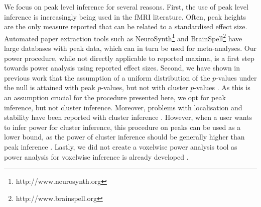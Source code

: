 We focus on peak level inference for several reasons.  First, the use of peak level inference is increasingly being used in the fMRI literature.  Often, peak heights are the only measure reported that can be related to a standardised effect size.  Automated paper extraction tools such as NeuroSynth\footnote{http://www.neurosynth.org} and BrainSpell\footnote{http://www.brainspell.org} have large databases with peak data, which can in turn be used for meta-analyses.  Our power procedure, while not directly applicable to reported maxima, is a first step towards power analysis using reported effect sizes.  Second, we have shown in previous work that the assumption of a uniform distribution of the $p$-values under the null is attained with peak $p$-values, but not with cluster $p$-values \citep{Durnez2014}.  As this is an assumption crucial for the procedure presented here, we opt for peak inference, but not cluster inference.  Moreover, problems with localisation and stability have been reported with cluster inference \citep{Roels2014,Woo2014,Eklund2016}.  However, when a user wants to infer power for cluster inference, this procedure on peaks can be used as a lower bound, as the power of cluster inference should be generally higher than peak inference \citep{Friston2007}.  Lastly, we did not create a voxelwise power analysis tool as power analysis for voxelwise inference is already developed \citep{Hayasaka2007,Mumford2008}.

